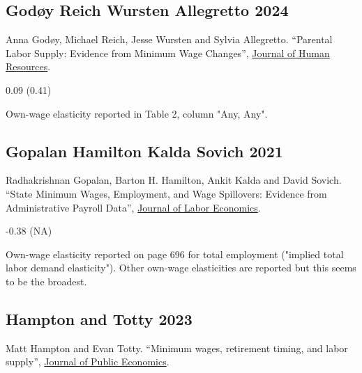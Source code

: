 \subsection*{Godøy Reich Wursten Allegretto 2024}
\vspace{-0.7em}

\noindent Anna Godøy, Michael Reich, Jesse Wursten and Sylvia Allegretto. ``Parental Labor Supply: Evidence from Minimum Wage Changes'', \href{https://doi.org/10.3368/jhr.1119-10540R2}{Journal of Human Resources}.

\vspace{0.7em}

 0.09 (0.41)

\vspace{0.7em}

 Own-wage elasticity reported in Table 2, column "Any, Any".

\subsection*{Gopalan Hamilton Kalda Sovich 2021}
\vspace{-0.7em}

\noindent Radhakrishnan Gopalan, Barton H. Hamilton, Ankit Kalda and David Sovich. ``State Minimum Wages, Employment, and Wage Spillovers: Evidence from Administrative Payroll Data'', \href{https://doi.org/10.1086/711355}{Journal of Labor Economics}.

\vspace{0.7em}

 -0.38 (NA)

\vspace{0.7em}

 Own-wage elasticity reported on page 696 for total employment ("implied total labor demand elasticity"). Other own-wage elasticities are reported but this seems to be the broadest.

\subsection*{Hampton and Totty 2023}
\vspace{-0.7em}

\noindent Matt Hampton and Evan Totty. ``Minimum wages, retirement timing, and labor supply'', \href{https://doi.org/10.1016/j.jpubeco.2023.104924}{Journal of Public Economics}.

